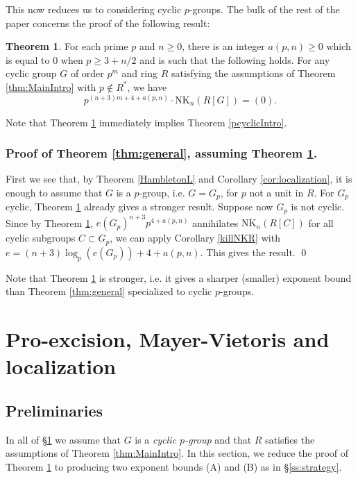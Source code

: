 \documentclass[reqno,11pt,letterpaper]{amsart}
\theoremstyle{plain}
\numberwithin{equation}{subsection}
\newtheorem{theorem}[equation]{Theorem}
\theoremstyle{remark}
\theoremstyle{plain}
\theoremstyle{definition}\newtheorem*{notation}{Notation}
\newtheorem{theorem}{Theorem}
\newcommand{\RNK}{\mathrm{NK}}
\begin{document}
This now reduces us to considering   cyclic $p$-groups. The bulk of the rest of the paper 
concerns the proof of the following result:


  \begin{theorem}\label{thmexpo}   For each prime $p$ and $n\geq 0$, there is an integer $a(p, n)\geq 0$ 
which is equal to $0$ when $p\geq 3+n/2$ and is such that the following holds. 
For any  cyclic group $G$ of order $p^m$ and ring $R$ satisfying the assumptions of Theorem \ref{thm:MainIntro} with $p\not\in R^*$, we have 
\[
p^{(n+3)m+4+a(p, n) }\cdot \RNK_n(R[G])=(0).
\]
  \end{theorem}
  
 
  Note that Theorem \ref{thmexpo} immediately implies 
  Theorem \ref{pcyclicIntro}. 
  

   
  \subsubsection{Proof of Theorem \ref{thm:general},  assuming Theorem \ref{thmexpo}.}
  First we see that, by Theorem \ref{HambletonL} and Corollary \ref{cor:localization}, it is enough to assume that 
  $G$ is a $p$-group, i.e. $G=G_p$, for $p$ not a unit in $R$. 
   For $G_p$ cyclic, Theorem \ref{thmexpo}
  already gives a stronger result. Suppose now $G_p$ is not cyclic.
 Since by Theorem \ref{thmexpo},  $e(G_p)^{n+3}p^{4+a(p,n) }$ annihilates $\RNK_n(R[C])$ for all cyclic subgroups $C\subset G_p$,
  we can apply Corollary \ref{killNKR} with $e=(n+3)\log_p(e(G_p))+4+a(p,n)$.  This gives the result. \qed

Note that Theorem \ref{thmexpo} is stronger, i.e. it
gives a sharper (smaller) exponent bound than  Theorem \ref{thm:general} specialized to cyclic $p$-groups.


  

 
 \section{Pro-excision, Mayer-Vietoris and localization}\label{sec:ProMV}
 
 \subsection{Preliminaries}
 
In all of \S \ref{sec:ProMV} we assume that $G$ is a {\sl cyclic $p$-group} and that $R$ satisfies the assumptions of Theorem \ref{thm:MainIntro}. In this section, we reduce the proof of Theorem \ref{thmexpo} to 
producing two exponent bounds (A) and (B) as in \S \ref{ss:strategy}. 
\end{document}
